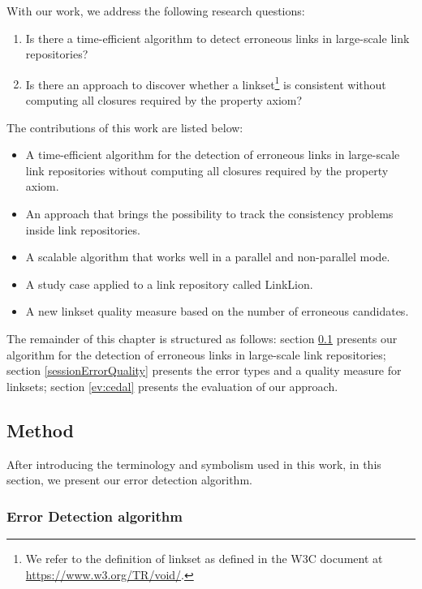 With our work, we address the following research questions:
\begin{enumerate}
	\item Is there a time-efficient algorithm to detect erroneous links in large-scale link repositories?
	\item Is there an approach to discover whether a linkset\footnote{We refer to the definition of linkset as defined in the W3C document at \url{https://www.w3.org/TR/void/}.} is consistent without computing all closures required by the property axiom?
\end{enumerate}
%
The contributions of this work are listed below:
\begin{itemize}
	\item A time-efficient algorithm for the detection of erroneous links in large-scale link repositories without computing all closures required by the property axiom.
	\item An approach that brings the possibility to track the consistency problems inside link repositories.
	\item A scalable algorithm that works well in a parallel and non-parallel mode.
	\item A study case applied to a link repository called LinkLion.
	\item A new linkset quality measure based on the number of erroneous candidates.
\end{itemize} 
%
The remainder of this chapter is structured as follows: section \ref{approach} presents our algorithm for the detection of erroneous links in large-scale link repositories; section \ref{sessionErrorQuality} presents the error types and a quality measure for linksets; section \ref{ev:cedal} presents the evaluation of our approach.

\subsection{Method} \label{approach}
After introducing the terminology and symbolism used in this work, in this section, we present our error detection algorithm.

\subsubsection{Error Detection algorithm}

